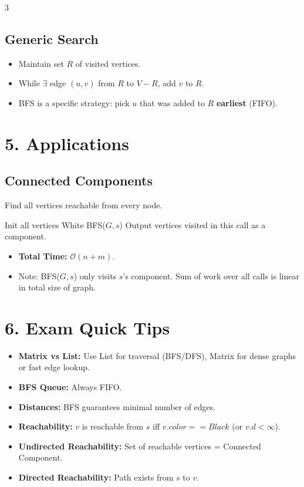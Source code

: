 \documentclass[10pt, a4paper, landscape]{article}
\newcommand{\bigO}{\mathcal{O}}
\begin{document}
\begin{multicols*}{3}
\subsection*{Generic Search}
\begin{itemize}
    \item Maintain set $R$ of visited vertices.
    \item While $\exists$ edge $(u, v)$ from $R$ to $V-R$, add $v$ to $R$.
    \item BFS is a specific strategy: pick $u$ that was added to $R$ \textbf{earliest} (FIFO).
\end{itemize}

\section{5. Applications}

\subsection*{Connected Components}
Find all vertices reachable from every node.
\begin{algorithmic}[1]
\STATE Init all vertices White
        \STATE BFS($G, s$)
        \STATE Output vertices visited in this call as a component.
    \ENDIF
\ENDFOR
\end{algorithmic}
\begin{itemize}
    \item \textbf{Total Time:} $\bigO(n + m)$.
    \item Note: BFS($G, s$) only visits $s$'s component. Sum of work over all calls is linear in total size of graph.
\end{itemize}

\section{6. Exam Quick Tips}
\begin{itemize}
    \item \textbf{Matrix vs List:} Use List for traversal (BFS/DFS), Matrix for dense graphs or fast edge lookup.
    \item \textbf{BFS Queue:} Always FIFO.
    \item \textbf{Distances:} BFS guarantees minimal number of edges.
    \item \textbf{Reachability:} $v$ is reachable from $s$ iff $v.color == Black$ (or $v.d < \infty$).
    \item \textbf{Undirected Reachability:} Set of reachable vertices = Connected Component.
    \item \textbf{Directed Reachability:} Path exists from $s$ to $v$.
\end{itemize}

\end{multicols*}
\end{document}
